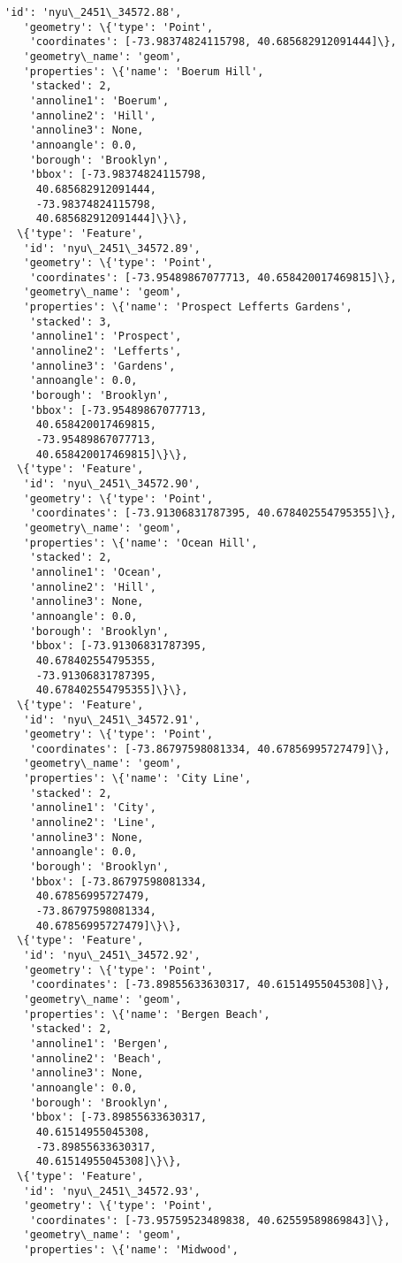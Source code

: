 \documentclass[11pt]{article}
\begin{document}
\begin{tcolorbox}[breakable, size=fbox, boxrule=.5pt, pad at break*=1mm, opacityfill=0]
\begin{Verbatim}[commandchars=\\\{\}]
   'id': 'nyu\_2451\_34572.88',
   'geometry': \{'type': 'Point',
    'coordinates': [-73.98374824115798, 40.685682912091444]\},
   'geometry\_name': 'geom',
   'properties': \{'name': 'Boerum Hill',
    'stacked': 2,
    'annoline1': 'Boerum',
    'annoline2': 'Hill',
    'annoline3': None,
    'annoangle': 0.0,
    'borough': 'Brooklyn',
    'bbox': [-73.98374824115798,
     40.685682912091444,
     -73.98374824115798,
     40.685682912091444]\}\},
  \{'type': 'Feature',
   'id': 'nyu\_2451\_34572.89',
   'geometry': \{'type': 'Point',
    'coordinates': [-73.95489867077713, 40.658420017469815]\},
   'geometry\_name': 'geom',
   'properties': \{'name': 'Prospect Lefferts Gardens',
    'stacked': 3,
    'annoline1': 'Prospect',
    'annoline2': 'Lefferts',
    'annoline3': 'Gardens',
    'annoangle': 0.0,
    'borough': 'Brooklyn',
    'bbox': [-73.95489867077713,
     40.658420017469815,
     -73.95489867077713,
     40.658420017469815]\}\},
  \{'type': 'Feature',
   'id': 'nyu\_2451\_34572.90',
   'geometry': \{'type': 'Point',
    'coordinates': [-73.91306831787395, 40.678402554795355]\},
   'geometry\_name': 'geom',
   'properties': \{'name': 'Ocean Hill',
    'stacked': 2,
    'annoline1': 'Ocean',
    'annoline2': 'Hill',
    'annoline3': None,
    'annoangle': 0.0,
    'borough': 'Brooklyn',
    'bbox': [-73.91306831787395,
     40.678402554795355,
     -73.91306831787395,
     40.678402554795355]\}\},
  \{'type': 'Feature',
   'id': 'nyu\_2451\_34572.91',
   'geometry': \{'type': 'Point',
    'coordinates': [-73.86797598081334, 40.67856995727479]\},
   'geometry\_name': 'geom',
   'properties': \{'name': 'City Line',
    'stacked': 2,
    'annoline1': 'City',
    'annoline2': 'Line',
    'annoline3': None,
    'annoangle': 0.0,
    'borough': 'Brooklyn',
    'bbox': [-73.86797598081334,
     40.67856995727479,
     -73.86797598081334,
     40.67856995727479]\}\},
  \{'type': 'Feature',
   'id': 'nyu\_2451\_34572.92',
   'geometry': \{'type': 'Point',
    'coordinates': [-73.89855633630317, 40.61514955045308]\},
   'geometry\_name': 'geom',
   'properties': \{'name': 'Bergen Beach',
    'stacked': 2,
    'annoline1': 'Bergen',
    'annoline2': 'Beach',
    'annoline3': None,
    'annoangle': 0.0,
    'borough': 'Brooklyn',
    'bbox': [-73.89855633630317,
     40.61514955045308,
     -73.89855633630317,
     40.61514955045308]\}\},
  \{'type': 'Feature',
   'id': 'nyu\_2451\_34572.93',
   'geometry': \{'type': 'Point',
    'coordinates': [-73.95759523489838, 40.62559589869843]\},
   'geometry\_name': 'geom',
   'properties': \{'name': 'Midwood',

\end{Verbatim}
\end{tcolorbox}
\end{document}
